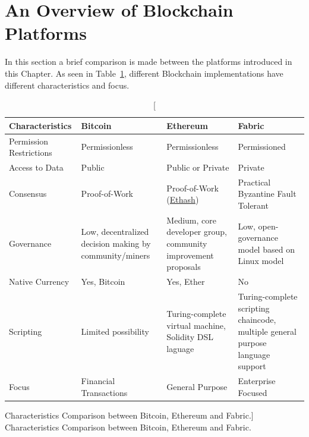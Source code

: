 \section{An Overview of Blockchain Platforms}

In this section a brief comparison is made between the platforms introduced in
this Chapter. As seen in Table~\ref{tab:blockchainComparison}, different
Blockchain implementations have different characteristics and focus.

\begin{table}[h!]
	\centering
	
	\begin{tabular}{ p{4cm} p{3.4cm} p{4cm} p{4.4cm} }
    \textbf{Characteristics} & \textbf{Bitcoin} & \textbf{Ethereum} &
    \textbf{Fabric} \\ \hline
    Permission Restrictions & Permissionless & Permissionless & Permissioned
    \\[7pt] Access to Data & Public & Public or Private & Private \\[7pt]
    Consensus & Proof-of-Work & Proof-of-Work
    (\href{https://github.com/ethereum/wiki/wiki/Ethash}{Ethash}) & Practical
    Byzantine Fault Tolerant \\[7pt] Governance & Low, decentralized decision
    making by community/miners & Medium, core developer group, community
    improvement proposals & Low, open-governance model based on Linux model
    \\[7pt] Native Currency & Yes, Bitcoin & Yes, Ether & No \\[7pt] Scripting
    & Limited possibility & Turing-complete virtual machine, Solidity DSL
    laguage & Turing-complete scripting chaincode, multiple general purpose
    language support \\[7pt] Focus & Financial Transactions & General Purpose &
    Enterprise Focused \\
		\hline
	\end{tabular}
	
	\caption
	[Characteristics Comparison between Bitcoin, Ethereum and Fabric.]
	{Characteristics Comparison between Bitcoin, Ethereum and Fabric.}
	
	\label{tab:blockchainComparison}
\end{table}

